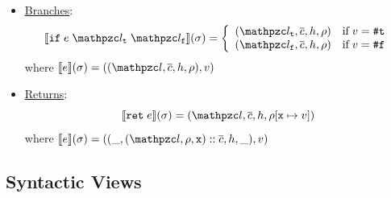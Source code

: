 \begin{itemize}
  \item \underline{Branches}:
    \[
      \sem{\kwif \; \expr \; \lab_\vart \; \lab_\varf}(\st) =
      \left\{
        \begin{array}{ll}
          (\lab_\vart, \ctxts, \heap, \env) & \text{if} \; \val = \true\\
          (\lab_\varf, \ctxts, \heap, \env) & \text{if} \; \val = \false\\
        \end{array}
      \right.
    \]
    where $\sem{\expr}(\st) = ((\lab, \ctxts, \heap, \env), \val)$

  \item \underline{Returns}:
    \[
      \sem{\kwret \; \expr}(\st) = (\lab, \ctxts, \heap, \env[\varx \mapsto
      \val])
    \]
    where $\sem{\expr}(\st) = ((\_, (\lab, \env, \varx) :: \ctxts, \heap, \_),
    \val)$
\end{itemize}


\subsection{Syntactic Views}

